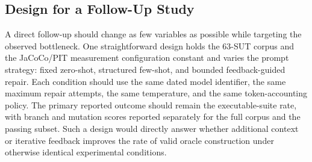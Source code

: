 \subsection{Design for a Follow-Up Study}
A direct follow-up should change as few variables as possible while targeting the observed bottleneck. One straightforward design holds the 63-SUT corpus and the JaCoCo/PIT measurement configuration constant and varies the prompt strategy: fixed zero-shot, structured few-shot, and bounded feedback-guided repair. Each condition should use the same dated model identifier, the same maximum repair attempts, the same temperature, and the same token-accounting policy. The primary reported outcome should remain the executable-suite rate, with branch and mutation scores reported separately for the full corpus and the passing subset. Such a design would directly answer whether additional context or iterative feedback improves the rate of valid oracle construction under otherwise identical experimental conditions.
